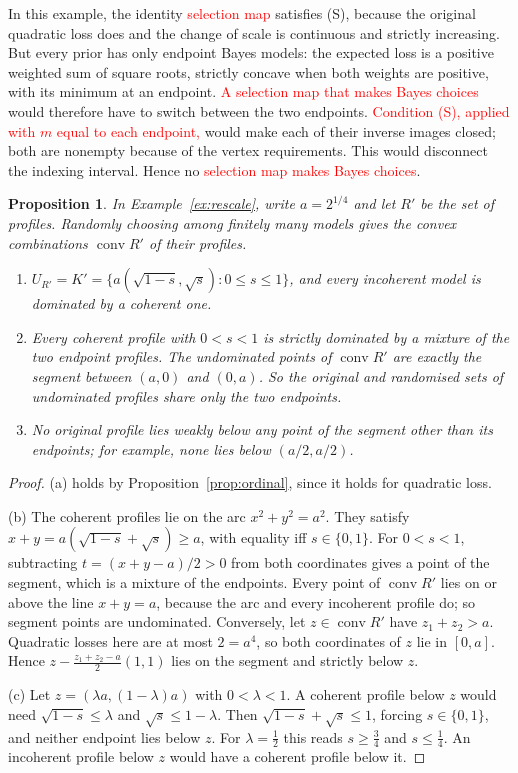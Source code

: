 \documentclass[11pt]{article}
\newtheorem{proposition}[theorem]{Proposition}
\theoremstyle{definition}
\theoremstyle{remark}
\newcommand{\co}{\operatorname{conv}}
\begin{document}
In this example, the identity \textcolor{red}{selection map} satisfies (S), because the original quadratic loss does and the change of scale is continuous and strictly increasing. But every prior has only endpoint Bayes models: the expected loss is a positive weighted sum of square roots, strictly concave when both weights are positive, with its minimum at an endpoint. \textcolor{red}{A selection map that makes Bayes choices} would therefore have to switch between the two endpoints. \textcolor{red}{Condition (S), applied with $m$ equal to each endpoint,} would make each of their inverse images closed; both are nonempty because of the vertex requirements. This would disconnect the indexing interval. Hence no \textcolor{red}{selection map makes Bayes choices}.\label{rem:bayeschoice}

\label{sec:random}
\begin{proposition}\label{prop:random}
In Example~\ref{ex:rescale}, write $a=2^{1/4}$ and let $R'$ be the set of profiles. Randomly choosing among finitely many models gives the convex combinations $\co R'$ of their profiles.
\begin{enumerate}[label=(\alph*)]
\item $U_{R'}=K'=\{a(\sqrt{1-s},\sqrt s):0\le s\le1\}$, and every incoherent model is dominated by a coherent one.
\item Every coherent profile with $0<s<1$ is strictly dominated by a mixture of the two endpoint profiles. The undominated points of $\co R'$ are exactly the segment between $(a,0)$ and $(0,a)$. So the original and randomised sets of undominated profiles share only the two endpoints.
\item No original profile lies weakly below any point of the segment other than its endpoints; for example, none lies below $(a/2,a/2)$.
\end{enumerate}
\end{proposition}
\begin{proof}
(a) holds by Proposition~\ref{prop:ordinal}, since it holds for quadratic loss.

(b) The coherent profiles lie on the arc $x^2+y^2=a^2$. They satisfy $x+y=a(\sqrt{1-s}+\sqrt s)\ge a$, with equality iff $s\in\{0,1\}$. For $0<s<1$, subtracting $t=(x+y-a)/2>0$ from both coordinates gives a point of the segment, which is a mixture of the endpoints. Every point of $\co R'$ lies on or above the line $x+y=a$, because the arc and every incoherent profile do; so segment points are undominated. Conversely, let $z\in\co R'$ have $z_1+z_2>a$. Quadratic losses here are at most $2=a^4$, so both coordinates of $z$ lie in $[0,a]$. Hence $z-\tfrac{z_1+z_2-a}2(1,1)$ lies on the segment and strictly below $z$.

(c) Let $z=(\lambda a,(1-\lambda)a)$ with $0<\lambda<1$. A coherent profile below $z$ would need $\sqrt{1-s}\le\lambda$ and $\sqrt s\le1-\lambda$. Then $\sqrt{1-s}+\sqrt s\le1$, forcing $s\in\{0,1\}$, and neither endpoint lies below $z$. For $\lambda=\tfrac12$ this reads $s\ge\tfrac34$ and $s\le\tfrac14$. An incoherent profile below $z$ would have a coherent profile below it.
\end{proof}
\end{document}
